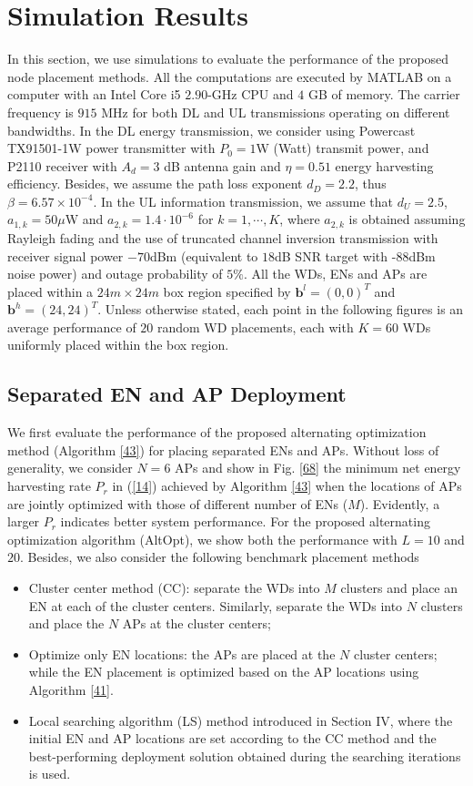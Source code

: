 \documentclass[journal, draftcls, one column, 12pt]{IEEEtran}
\begin{document}
\section{Simulation Results}
In this section, we use simulations to evaluate the performance of the proposed node placement methods. All the computations are executed by MATLAB on a computer with an Intel Core i5 $2.90$-GHz CPU and $4$ GB of memory. The carrier frequency is $915$ MHz for both DL and UL transmissions operating on different bandwidths. In the DL energy transmission, we consider using Powercast TX91501-1W power transmitter with $P_0=1$W (Watt) transmit power, and P2110 receiver with $A_d = 3$ dB antenna gain and $\eta= 0.51$ energy harvesting efficiency. Besides, we assume the path loss exponent $d_D = 2.2$, thus $\beta= 6.57\times 10^{-4}$. In the UL information transmission, we assume that $d_U = 2.5$, $a_{1,k} = 50\mu$W and $a_{2,k} = 1.4\cdot 10^{-6}$ for $k=1,\cdots,K$, where $a_{2,k}$ is obtained assuming Rayleigh fading and the use of truncated channel inversion transmission \cite{2005:Goldsmith} with receiver signal power $-70$dBm (equivalent to $18$dB SNR target with -$88$dBm noise power) and outage probability of $5\%$. All the WDs, ENs and APs are placed within a $24 m\times 24 m$ box region specified by $\mathbf{b}^l=(0,0)^T$ and $\mathbf{b}^h = (24,24)^T$. Unless otherwise stated, each point in the following figures is an average performance of $20$ random WD placements, each with $K= 60$ WDs uniformly placed within the box region.

\subsection{Separated EN and AP Deployment}
We first evaluate the performance of the proposed alternating optimization method (Algorithm \ref{43}) for placing separated ENs and APs. Without loss of generality, we consider $N=6$ APs and show in Fig. \ref{68} the minimum net energy harvesting rate $P_r$ in (\ref{14}) achieved by Algorithm \ref{43} when the locations of APs are jointly optimized with those of different number of ENs ($M$). Evidently, a larger $P_r$ indicates better system performance. For the proposed alternating optimization algorithm (AltOpt), we show both the performance with $L=10$ and $20$. Besides, we also consider the following benchmark placement methods
\begin{itemize}
  \item Cluster center method (CC): separate the WDs into $M$ clusters and place an EN at each of the cluster centers. Similarly, separate the WDs into $N$ clusters and place the $N$ APs at the cluster centers;
  \item Optimize only EN locations: the APs are placed at the $N$ cluster centers; while the EN placement is optimized based on the AP locations using Algorithm \ref{41}.
  \item Local searching algorithm (LS) method introduced in Section IV, where the initial EN and AP locations are set according to the CC method and the best-performing deployment solution obtained during the searching iterations is used.
\end{itemize}
\end{document}
